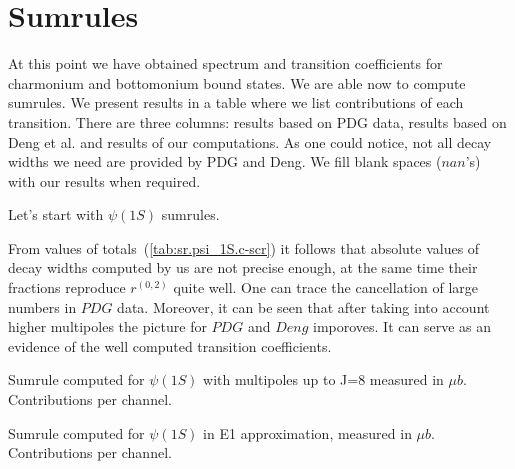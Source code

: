 \chapter{Sumrules}

At this point we have obtained spectrum and transition coefficients for charmonium and bottomonium bound states. We are able now to compute sumrules. We present results in a table where we list contributions of each transition. There are three columns: results based on PDG data, results based on Deng et al. and results of our computations. As one could notice, not all decay widths we need are provided by PDG and Deng. We fill blank spaces ($nan$'s) with our results when required.

Let's start with $\psi(1S)$ sumrules.

\begin{table}[H] 
\end{table}

From values of totals~(\cref{tab:sr.psi_1S.c-scr}) it follows that absolute values of decay widths computed by us are not precise enough, at the same time their fractions reproduce $r^{(0,2)}$ quite well. One can trace the cancellation of large numbers in $PDG$ data. Moreover, it can be seen that after taking into account higher multipoles the picture for $PDG$ and $Deng$ imporoves. It can serve as an evidence of the well computed transition coefficients.

\begin{table}
    {\caption{Sumrule computed for $\psi(1S)$ with multipoles up to J=8 measured in $\mu b$. Contributions per channel.}}
    
\end{table}

\begin{table}[H]
    {\caption{Sumrule computed for $\psi(1S)$ in E1 approximation, measured in $\mu b$. Contributions per channel.}}
    
\end{table}

